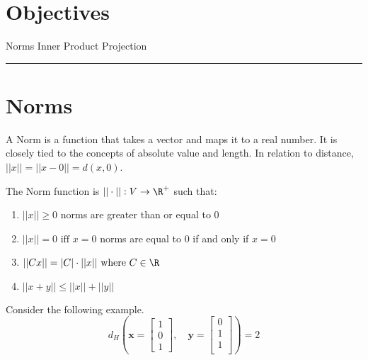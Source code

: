 
\section*{Objectives}
\begin{outline}
    \1 Norms
    \1 Inner Product
    \1 Projection
\end{outline}

\rule[0.0051in]{\textwidth}{0.00025in}
\section{Norms}

A Norm is a function that takes a vector and maps it to a real number. It is closely tied to the concepts of absolute value and length. In relation to distance, $||x|| = ||x - 0|| = d(x,0)$. 

The Norm function is $||\cdot|| : V \rightarrow \R^{+}$ such that:

\begin{enumerate}
	\item $||x|| \ge 0$    norms are greater than or equal to 0
	\item $||x|| = 0 \text{ iff } x = 0$    norms are equal to 0 if and only if $x = 0$
	\item $||Cx|| = |C| \cdot ||x|| \text{ where } C \in \R$
	\item $||x+y|| \leq ||x|| + ||y||$
\end{enumerate}


Consider the following example.
\[
d_H \left( \mathbf{{x}} = 
\begin{bmatrix}
    1 \\
    0 \\
    1 
\end{bmatrix}, 
\quad
\mathbf{{y}} = 
\begin{bmatrix}
    0 \\
    1 \\
    1 \\
\end{bmatrix} \right) = 2
\]

